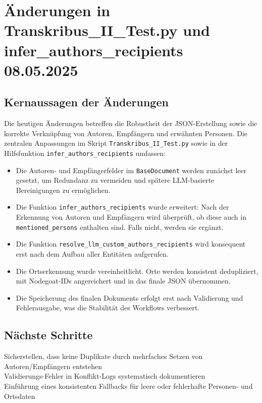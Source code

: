 \documentclass{article}
\begin{document}
\noindent\hrulefill
\section{Änderungen in Transkribus\_II\_Test.py und infer\_authors\_recipients \small 08.05.2025}

\subsection*{Kernaussagen der Änderungen}
Die heutigen Änderungen betreffen die Robustheit der JSON-Erstellung sowie die korrekte Verknüpfung von Autoren, Empfängern und erwähnten Personen. Die zentralen Anpassungen im Skript \texttt{Transkribus\_II\_Test.py} sowie in der Hilfsfunktion \texttt{infer\_authors\_recipients} umfassen:

\begin{itemize}
    \item Die Autoren- und Empfängerfelder im \texttt{BaseDocument} werden zunächst leer gesetzt, um Redundanz zu vermeiden und spätere LLM-basierte Bereinigungen zu ermöglichen.
    \item Die Funktion \texttt{infer\_authors\_recipients} wurde erweitert: Nach der Erkennung von Autoren und Empfängern wird überprüft, ob diese auch in \texttt{mentioned\_persons} enthalten sind. Falls nicht, werden sie ergänzt.
    \item Die Funktion \texttt{resolve\_llm\_custom\_authors\_recipients} wird konsequent erst nach dem Aufbau aller Entitäten aufgerufen.
    \item Die Ortserkennung wurde vereinheitlicht. Orte werden konsistent dedupliziert, mit Nodegoat-IDs angereichert und in das finale JSON übernommen.
    \item Die Speicherung des finalen Dokuments erfolgt erst nach Validierung und Fehlerausgabe, was die Stabilität des Workflows verbessert.
\end{itemize}

\subsection*{Nächste Schritte}
 Sicherstellen, dass keine Duplikate durch mehrfaches Setzen von Autoren/Empfängern entstehen\\
 Validierungs-Fehler in Konflikt-Logs systematisch dokumentieren\\
 Einführung eines konsistenten Fallbacks für leere oder fehlerhafte Personen- und Ortsdaten\\
\end{document}
